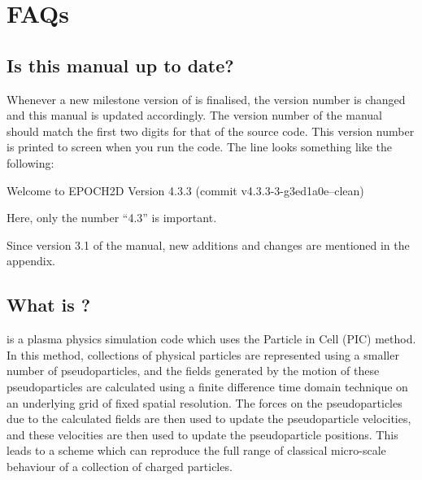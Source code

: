 


%

{
  \selectfont
}
\selectfont%
\tableofcontents%
\newpage%
\DefineShortVerb{\#}

\section{FAQs}

\subsection{Is this manual up to date?}

Whenever a new milestone version of {\EPOCH} is finalised, the version
number is changed and this manual is updated accordingly. The version number
of the manual should match the first two digits for that of the {\EPOCH}
source code.
This version number is printed to screen when you run the code. The line looks
something like the following:
\begin{boxverbatim}
 Welcome to EPOCH2D Version 4.3.3   (commit v4.3.3-3-g3ed1a0e--clean)
\end{boxverbatim}
Here, only the number ``4.3'' is important.

Since version 3.1 of the manual, new additions and changes are mentioned
in the appendix.

\subsection{What is {\EPOCH}?}

{\EPOCH} is a plasma physics simulation code which uses the Particle in Cell
(PIC) method. In this method, collections of physical particles are represented
using a smaller number of pseudoparticles, and the fields generated by the
motion of these pseudoparticles are calculated using a finite difference time
domain technique on an underlying grid of fixed spatial resolution. The forces
on the pseudoparticles due to the calculated fields are then used to update the
pseudoparticle velocities, and these velocities are then used to update the
pseudoparticle positions. This leads to a scheme which can reproduce the full
range of classical micro-scale behaviour of a collection of charged
particles.

